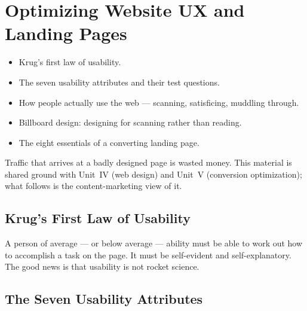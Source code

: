 \documentclass{MMTextbook}
\begin{document}
\chapter{Optimizing Website UX and Landing Pages}


\begin{learningoutcomes}
\begin{itemize}
\item Krug's first law of usability.
\item The seven usability attributes and their test questions.
\item How people actually use the web --- scanning, satisficing, muddling
      through.
\item Billboard design: designing for scanning rather than reading.
\item The eight essentials of a converting landing page.
\end{itemize}
\end{learningoutcomes}

Traffic that arrives at a badly designed page is wasted money. This material is
shared ground with Unit~IV (web design) and Unit~V (conversion optimization);
what follows is the content-marketing view of it.

\section{Krug's First Law of Usability}

\begin{keybox}
A person of average --- or below average --- ability must be able to work out how
to accomplish a task on the page. It must be self-evident and self-explanatory.
The good news is that usability is not rocket science.
\end{keybox}

\section{The Seven Usability Attributes}
\end{document}

